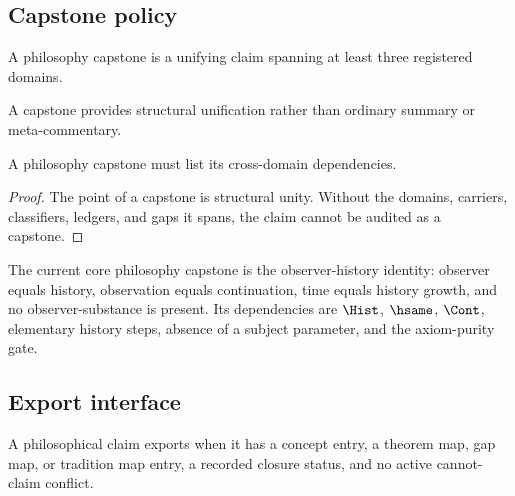 \subsection{Capstone policy}
\label{subsec:philosophy-package-capstone-policy}

\begin{definition}
\label{def:philosophy-package-capstone}
A philosophy capstone is a unifying claim spanning at least three
registered domains.
\end{definition}

\begin{definition}
\label{def:philosophy-package-capstone-not-commentary}
A capstone provides structural unification rather than ordinary
summary or meta-commentary.
\end{definition}

\begin{theorem}
\label{thm:philosophy-package-capstones-require-dependencies}
A philosophy capstone must list its cross-domain dependencies.
\end{theorem}
\begin{proof}
The point of a capstone is structural unity. Without the domains,
carriers, classifiers, ledgers, and gaps it spans, the claim cannot be
audited as a capstone.
\end{proof}

\begin{corollary}
\label{cor:philosophy-package-observer-history-capstone}
The current core philosophy capstone is the observer-history identity:
observer equals history, observation equals continuation, time equals
history growth, and no observer-substance is present. Its dependencies
are \(\Hist\), \(\hsame\), \(\Cont\), elementary history steps, absence
of a subject parameter, and the axiom-purity gate.
\end{corollary}

\subsection{Export interface}
\label{subsec:philosophy-package-export-interface}

\begin{definition}
\label{def:philosophy-export}
A philosophical claim exports when it has a concept entry, a theorem
map, gap map, or tradition map entry, a recorded closure status, and no
active cannot-claim conflict.
\end{definition}

